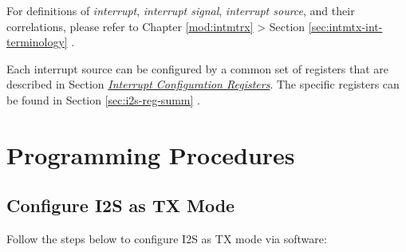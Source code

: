 \documentclass[main\_\_EN.tex]{subfiles}
\begin{document}
\begin{tiplisting}
For definitions of \textit{interrupt}, \textit{interrupt signal}, \textit{interrupt source}, and their correlations, please refer to Chapter \ref{mod:intmtrx} \textit{} > Section \ref{sec:intmtx-int-terminology} \textit{}.
\end{tiplisting}

Each interrupt source can be configured by a common set of registers that are described in Section \hyperref[interrupt-config-registers]{\textit{Interrupt Configuration Registers}}. The specific registers can be found in Section \ref{sec:i2s-reg-summ} \textit{}.

\section{Programming Procedures}
\label{sec:i2s-prog-procedures}
\subsection{Configure I2S as TX Mode}\label{sec:i2s-configure-i2s-tx-mode}
Follow the steps below to configure I2S as TX mode via software:
\end{document}
